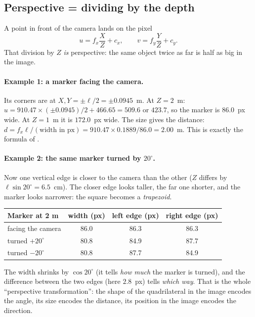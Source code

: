 \subsection{Perspective = dividing by the depth}

A point in front of the camera lands on the pixel
\begin{equation}
u = f_x \frac{X}{Z} + c_x, \qquad v = f_y \frac{Y}{Z} + c_y .
\label{eq:pinhole}
\end{equation}
That division by $Z$ \emph{is} perspective: the same object twice as far is half as big in the image.

\paragraph{Example 1: a marker facing the camera.} Its corners are at $X, Y = \pm\ell/2 = \pm 0.0945$~m. At
$Z = 2$~m: $u = 910.47 \times (\pm 0.0945)/2 + 466.65 = 509.6$ or $423.7$, so the marker is $86.0$~px wide. At
$Z = 1$~m it is $172.0$~px wide. The size gives the distance:
$d = f_x \ell / (\text{width in px}) = 910.47 \times 0.1889 / 86.0 = 2.00$~m. This is exactly the formula of
.

\paragraph{Example 2: the same marker turned by $20^\circ$.} Now one vertical edge is closer to the camera than the
other ($Z$ differs by $\ell\sin 20^\circ = 6.5$~cm). The closer edge looks taller, the far one shorter, and the
marker looks narrower: the square becomes a \emph{trapezoid}.

\begin{center}
\begin{tabular}{@{}lccc@{}}
\toprule
Marker at 2 m & width (px) & left edge (px) & right edge (px) \\
\midrule
facing the camera & 86.0 & 86.3 & 86.3 \\
turned $+20^\circ$ & 80.8 & 84.9 & 87.7 \\
turned $-20^\circ$ & 80.8 & 87.7 & 84.9 \\
\bottomrule
\end{tabular}
\end{center}

The width shrinks by $\cos 20^\circ$ (it tells \emph{how much} the marker is turned), and the difference between the two
edges (here $2.8$~px) tells \emph{which way}. That is the whole ``perspective transformation'': the shape of the
quadrilateral in the image encodes the angle, its size encodes the distance, its position in the image encodes the
direction.

